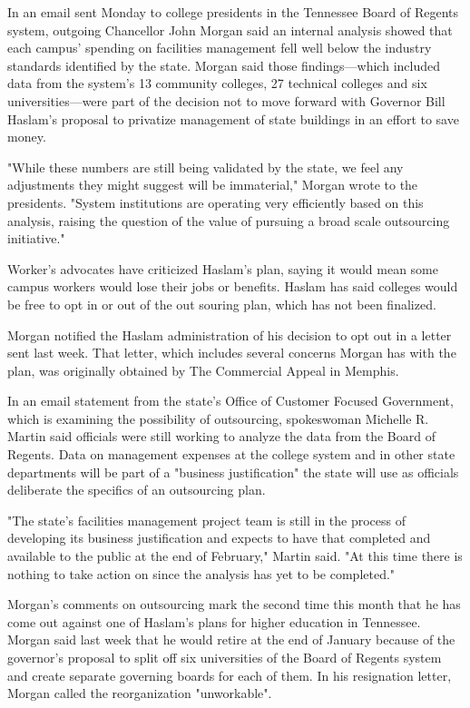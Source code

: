 \documentclass[UTF8,11pt]{ctexart}
\begin{document}
In an email sent Monday to college presidents in the Tennessee Board of Regents system, outgoing Chancellor John Morgan said an internal analysis showed that each campus' spending on facilities management fell well below the industry standards identified by the state. Morgan said those findings—which included data from the system's 13 community colleges, 27 technical colleges and six universities—were part of the decision not to move forward with Governor Bill Haslam's proposal to privatize management of state buildings in an effort to save money.


"While these numbers are still being validated by the state, we feel any adjustments they might suggest will be immaterial," Morgan wrote to the presidents. "System institutions are operating very efficiently based on this analysis, raising the question of the value of pursuing a broad scale outsourcing initiative."


Worker's advocates have criticized Haslam's plan, saying it would mean some campus workers would lose their jobs or benefits. Haslam has said colleges would be free to opt in or out of the out souring plan, which has not been finalized.


Morgan notified the Haslam administration of his decision to opt out in a letter sent last week. That letter, which includes several concerns Morgan has with the plan, was originally obtained by The Commercial Appeal in Memphis.


In an email statement from the state's Office of Customer Focused Government, which is examining the possibility of outsourcing, spokeswoman Michelle R. Martin said officials were still working to analyze the data from the Board of Regents. Data on management expenses at the college system and in other state departments will be part of a "business justification" the state will use as officials deliberate the specifics of an outsourcing plan.


"The state's facilities management project team is still in the process of developing its business justification and expects to have that completed and available to the public at the end of February," Martin said. "At this time there is nothing to take action on since the analysis has yet to be completed."


Morgan's comments on outsourcing mark the second time this month that he has come out against one of Haslam's plans for higher education in Tennessee. Morgan said last week that he would retire at the end of January because of the governor's proposal to split off six universities of the Board of Regents system and create separate governing boards for each of them. In his resignation letter, Morgan called the reorganization "unworkable".
\end{document}

